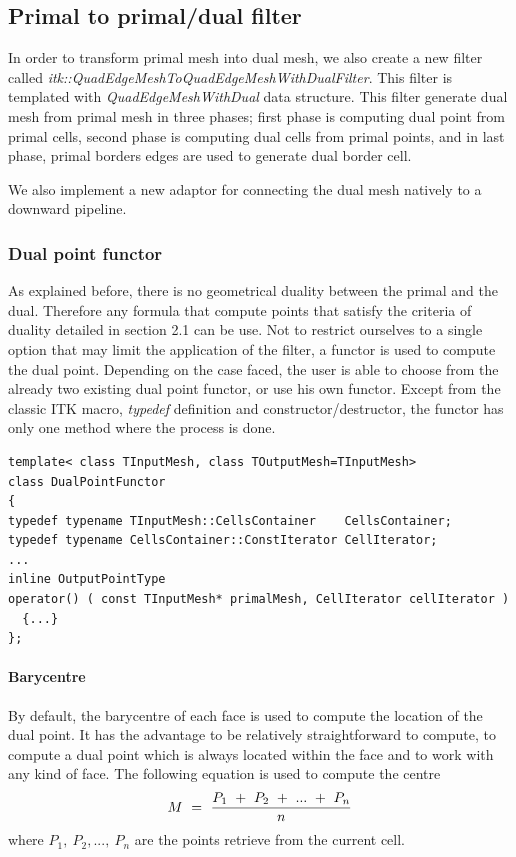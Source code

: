 \documentclass{InsightArticle}
\begin{document}
\subsection{Primal to primal/dual filter }
In order to transform primal mesh into dual mesh, we also create a new filter called \emph{itk::QuadEdgeMeshToQuadEdgeMeshWithDualFilter}. This filter is templated with \emph{QuadEdgeMeshWithDual} data structure. This filter generate dual mesh from primal mesh in three phases; first phase is computing dual point from primal cells, second phase is computing dual cells from primal points, and in last phase, primal borders edges are used to generate dual border cell.

We also implement a new adaptor for connecting the dual mesh natively to a downward pipeline.
\subsubsection{Dual point functor}
As explained before, there is no geometrical duality between the primal and the dual. Therefore any formula that compute points that satisfy the criteria of duality detailed in section 2.1 can be use. Not to restrict ourselves to a single option that may limit the application of the filter, a functor is used to compute the dual point. Depending on the case faced, the user is able to choose from the already two existing dual point functor, or use his own functor. Except from the classic ITK macro, \emph{typedef} definition and constructor/destructor, the functor has only one method where the process is done.
\begin{verbatim}
template< class TInputMesh, class TOutputMesh=TInputMesh>
class DualPointFunctor
{
typedef typename TInputMesh::CellsContainer    CellsContainer;
typedef typename CellsContainer::ConstIterator CellIterator;
...
inline OutputPointType 
operator() ( const TInputMesh* primalMesh, CellIterator cellIterator ) 
  {...}
};
\end{verbatim}
\paragraph{\textbf{Barycentre}}
By default, the barycentre of each face is used to compute the location of the dual point. It has the advantage to be relatively straightforward to compute, to compute a dual point which is always located within the face and to work with any kind of face. The following equation is used to compute the centre
\begin{equation}
\label{eq5}
M~=~\frac{P_1~+~P_2~+~\mathnormal{...}~+~P_n}{n}
\end{equation}
where $P_1,~P_2, ...,~P_n$ are the points retrieve from the current cell.
\end{document}

